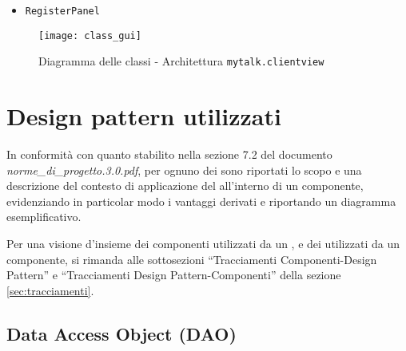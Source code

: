 \begin{itemize}[leftmargin=0em]

\item \texttt{RegisterPanel}

\end{itemize}

\begin{figure}[H]
  \centering
  \texttt{[image: class\_gui]}
  \caption{Diagramma delle classi - Architettura \texttt{mytalk.clientview}}\label{fig:sottoarchview}
\end{figure}
\clearpage

\section{Design pattern utilizzati}
In conformità con quanto stabilito nella sezione 7.2 del documento \textit{norme\_di\_progetto.3.0.pdf}, per ognuno dei  sono riportati lo scopo e una descrizione del contesto di applicazione del  all'interno di un componente, evidenziando in particolar modo i vantaggi derivati e riportando un diagramma esemplificativo.

Per una visione d'insieme dei componenti utilizzati da un , e dei  utilizzati da un componente, si rimanda alle sottosezioni ``Tracciamenti Componenti-Design Pattern'' e ``Tracciamenti Design Pattern-Componenti'' della sezione \vref{sec:tracciamenti}.

\subsection{Data Access Object (DAO)}\label{sec:patterndao}

